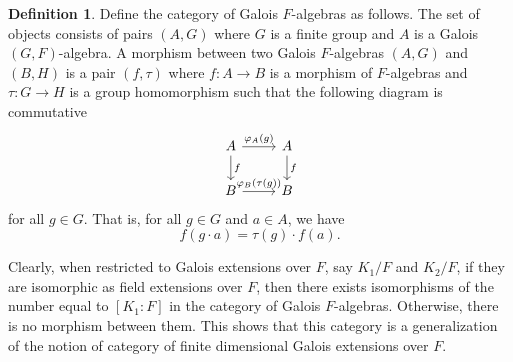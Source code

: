 \documentclass[12pt,a4paper]{amsart}
\numberwithin{equation}{section}%
\theoremstyle{plain}%
\theoremstyle{definition}%
\newtheorem{definition}[theorem]{Definition}%
\theoremstyle{remark}%
\begin{document}
	\begin{definition}\label{def: category of Galois algebras}
		Define the category of Galois $F$-algebras as follows.
		The set of objects consists of pairs $(A,G)$ where $G$ is a finite group and $A$ is a Galois $(G,F)$-algebra.
		A morphism between two Galois $F$-algebras $(A,G)$ and $(B,H)$ is a pair $(f,\tau)$ where $f:A\to B$ is a morphism of $F$-algebras and $\tau:G\to H$ is a group homomorphism such that the following diagram is commutative
		\begin{equation*}
			\begin{tikzcd}
				A\arrow[d,"f"]\arrow[r,"\varphi_A(g)"]&A\arrow[d,"f"]\\
				B\arrow[r,"\varphi_B(\tau(g))"]&B
			\end{tikzcd}
		\end{equation*}
		for all $g\in G$.
		That is, for all $g\in G$ and $a\in A$, we have
		\begin{equation*}
			f(g\cdot a)=\tau(g)\cdot f(a).
		\end{equation*}
	\end{definition}
	Clearly, when restricted to Galois extensions over $F$, say $K_1/F$ and $K_2/F$, if they are isomorphic as field extensions over $F$, then there exists isomorphisms of the number equal to $[K_1:F]$ in the category of Galois $F$-algebras.
	Otherwise, there is no morphism between them.
	This shows that this category is a generalization of the notion of category of finite dimensional Galois extensions over $F$.
	
\end{document}
